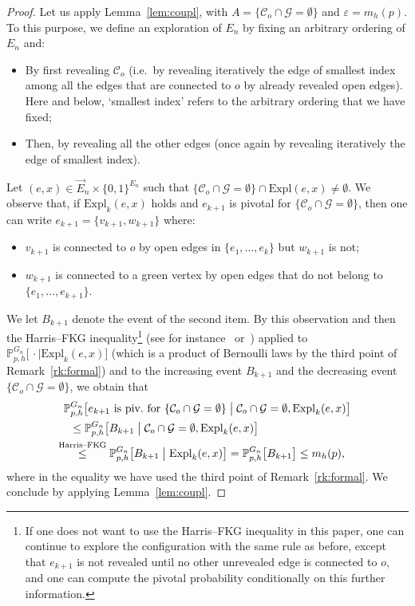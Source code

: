 \documentclass[AHL,Unicode,longabstracts,published]{cedram}
\newcommand{\Pro}{\mathbb{P}}
\newcommand{\calC}{\mathcal{C}}
\newcommand{\calG}{\mathcal{G}}
\newcommand{\Expl}{\mathrm{Expl}}
\begin{document}
\begin{proof}
Let us apply Lemma~\ref{lem:coupl}, with $A=\{\calC_o\cap\calG=\emptyset\}$ and $\varepsilon=m_h(p)$. To this purpose, we define an exploration of $E_n$ by fixing an arbitrary ordering of $E_n$ and:
\begin{itemize}
\item By first revealing $\calC_o$ (i.e.\ by revealing iteratively the edge of smallest index among all the edges that are connected to $o$ by already revealed open edges). Here and below, `smallest index' refers to the arbitrary ordering that we have fixed;
\item Then, by revealing all the other edges (once again by revealing iteratively the edge of smallest index).
\end{itemize}
Let $(e,x) \in \vec{E}_n\times\{0,1\}^{E_n}$ such that $\{\calC_o\cap\calG=\emptyset\}\cap\Expl(e,x)\neq\emptyset$. We observe that, if $\Expl_k(e,x)$ holds and $e_{k+1}$ is pivotal for $\{\calC_o \cap \calG = \emptyset\}$, then one can write $e_{k+1}=\{v_{k+1},w_{k+1}\}$ where:
\begin{itemize}
\item $v_{k+1}$ is connected to $o$ by open edges in $\{e_1,\dots,e_k\}$ but $w_{k+1}$ is not;
\item $w_{k+1}$ is connected to a green vertex by open edges that do not belong to $\{e_1,\dots,e_{k+1}\}$.
\end{itemize}
We let $B_{k+1}$ denote the event of the second item. By this observation and then the Harris--FKG inequality\footnote{If one does not want to use the Harris--FKG inequality in this paper, one can continue to explore the configuration with the same rule as before, except that $e_{k+1}$ is not revealed until no other unrevealed edge is connected to $o$, and one can compute the pivotal probability conditionally on this further information.} (see for instance~\cite[Theorem~2.4]{Gri99} or~\cite[Lemma~3]{BR06}) applied to $\Pro_{p,h}^{G_n} \big[\, \cdot \mid \Expl_k(e,x)\big]$ (which is a product of Bernoulli laws by the third point of Remark~\ref{rk:formal}) and to the increasing event $B_{k+1}$ and the decreasing event $\{\calC_o\cap\calG=\emptyset\}$, we obtain that
\pagebreak
\begin{multline*}
\Pro_{p,h}^{G_n} \big[e_{k+1}\text{ is piv.\ for } \{\calC_o \cap \calG = \emptyset\} \; \big| \; \calC_o \cap \calG = \emptyset, \Expl_k(e,x) \big]\\
\begin{aligned}
&\le \Pro_{p,h}^{G_n} \big[B_{k+1} \; \big| \; \calC_o \cap \calG = \emptyset, \Expl_k(e,x) \big]\\
&\mkern-23mu\overset{\text{Harris--FKG}}{\le} \Pro_{p,h}^{G_n} \big[B_{k+1} \; \big| \; \Expl_k(e,x) \big]= \Pro_{p,h}^{G_n} \big[B_{k+1} \big] \le m_h(p),
\end{aligned}
\end{multline*}
where in the equality we have used the third point of Remark~\ref{rk:formal}. We conclude by applying Lemma~\ref{lem:coupl}.
\end{proof}
\end{document}

